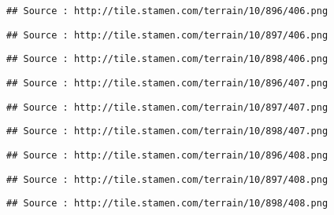 \documentclass[
  xelatex,ja=standard]{bxjsarticle}
\begin{document}
\begin{verbatim}
## Source : http://tile.stamen.com/terrain/10/896/406.png
\end{verbatim}

\begin{verbatim}
## Source : http://tile.stamen.com/terrain/10/897/406.png
\end{verbatim}

\begin{verbatim}
## Source : http://tile.stamen.com/terrain/10/898/406.png
\end{verbatim}

\begin{verbatim}
## Source : http://tile.stamen.com/terrain/10/896/407.png
\end{verbatim}

\begin{verbatim}
## Source : http://tile.stamen.com/terrain/10/897/407.png
\end{verbatim}

\begin{verbatim}
## Source : http://tile.stamen.com/terrain/10/898/407.png
\end{verbatim}

\begin{verbatim}
## Source : http://tile.stamen.com/terrain/10/896/408.png
\end{verbatim}

\begin{verbatim}
## Source : http://tile.stamen.com/terrain/10/897/408.png
\end{verbatim}

\begin{verbatim}
## Source : http://tile.stamen.com/terrain/10/898/408.png
\end{verbatim}
\end{document}
